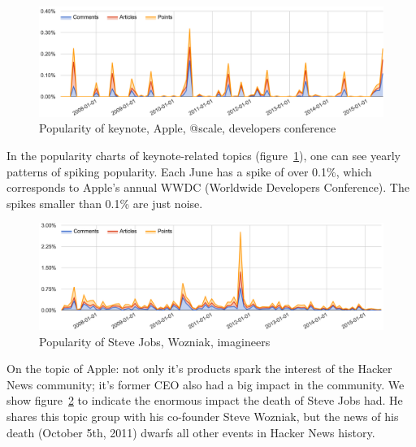 \begin{figure}[H] %
	\caption{Popularity of keynote, Apple, @scale, developers conference}
	\label{fig:trend_keynote}
	\centering
	\includegraphics[width=14cm]{topic_trends/keynote_relative}
\end{figure}
In the popularity charts of keynote-related topics (figure~\ref{fig:trend_keynote}), one can see yearly patterns of spiking popularity. Each June has a spike of over 0.1\%, which corresponds to Apple's annual WWDC (Worldwide Developers Conference). The spikes smaller than 0.1\% are just noise.

\begin{figure}[H] %
	\caption{Popularity of Steve Jobs, Wozniak, imagineers}
	\label{fig:trend_jobs}
	\centering
	\includegraphics[width=14cm]{topic_trends/jobs_relative}
\end{figure}

On the topic of Apple: not only it's products spark the interest of the Hacker News community; it's former CEO also had a big impact in the community. We show figure~\ref{fig:trend_jobs} to indicate the enormous impact the death of Steve Jobs had. He shares this topic group with his co-founder Steve Wozniak, but the news of his death (October 5th, 2011) dwarfs all other events in Hacker News history.

